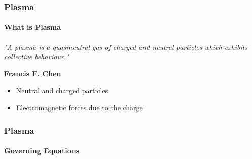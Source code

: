 \documentclass{beamer}
\begin{document}
%
\begin{frame}
	\frametitle{Plasma}
	\framesubtitle{What is Plasma}
	\indent \textit{\large"A plasma is a quasineutral gas of charged and neutral particles which exhibits
	collective behaviour."}
	\begin{flushright}
	    \textbf{Francis F. Chen} \citep{chen_introduction_1984}\\[1.0cm]
	\end{flushright}
	\begin{itemize}
		\item Neutral and charged particles
		\item Electromagnetic forces due to the charge
	\end{itemize}
\end{frame}

\begin{frame}
	\frametitle{Plasma}
	\framesubtitle{Governing Equations}
\end{frame}

%
\end{document}

